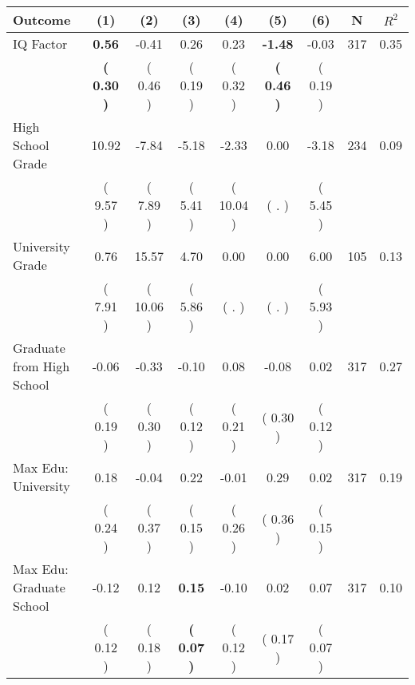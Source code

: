 \begin{tabular}{lcccccccc}
\toprule
 \textbf{Outcome} & \textbf{(1)} & \textbf{(2)} & \textbf{(3)} & \textbf{(4)} & \textbf{(5)} & \textbf{(6)} & \textbf{N} & \textbf{$ R^2$} \\
\midrule
IQ Factor & \textbf{     0.56} &     -0.41 &      0.26 &      0.23 & \textbf{    -1.48} &     -0.03 & 317 &       0.35 \\ 
 & \textbf{(     0.30 )} & (     0.46 ) & (     0.19 ) & (     0.32 ) & \textbf{(     0.46 )} & (     0.19 ) & \\
High School Grade &     10.92 &     -7.84 &     -5.18 &     -2.33 &      0.00 &     -3.18 & 234 &       0.09 \\ 
 & (     9.57 ) & (     7.89 ) & (     5.41 ) & (    10.04 ) & (        . ) & (     5.45 ) & \\
University Grade &      0.76 &     15.57 &      4.70 &      0.00 &      0.00 &      6.00 & 105 &       0.13 \\ 
 & (     7.91 ) & (    10.06 ) & (     5.86 ) & (        . ) & (        . ) & (     5.93 ) & \\
Graduate from High School &     -0.06 &     -0.33 &     -0.10 &      0.08 &     -0.08 &      0.02 & 317 &       0.27 \\ 
 & (     0.19 ) & (     0.30 ) & (     0.12 ) & (     0.21 ) & (     0.30 ) & (     0.12 ) & \\
Max Edu: University &      0.18 &     -0.04 &      0.22 &     -0.01 &      0.29 &      0.02 & 317 &       0.19 \\ 
 & (     0.24 ) & (     0.37 ) & (     0.15 ) & (     0.26 ) & (     0.36 ) & (     0.15 ) & \\
Max Edu: Graduate School &     -0.12 &      0.12 & \textbf{     0.15} &     -0.10 &      0.02 &      0.07 & 317 &       0.10 \\ 
 & (     0.12 ) & (     0.18 ) & \textbf{(     0.07 )} & (     0.12 ) & (     0.17 ) & (     0.07 ) & \\
\bottomrule
\end{tabular}
